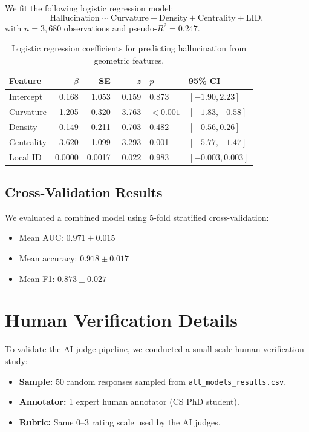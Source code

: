 \documentclass{article}
\begin{document}
We fit the following logistic regression model:
\begin{equation*}
    \text{Hallucination} \sim \text{Curvature} + \text{Density} + \text{Centrality} + \text{LID},
\end{equation*}
with $n = 3{,}680$ observations and pseudo-$R^{2} = 0.247$.

\begin{table}[h]
    \centering
    \caption{Logistic regression coefficients for predicting hallucination from geometric features.}
    \label{tab:logit-full}
    \begin{tabular}{l r r r l l}
        \toprule
        Feature      & $\beta$ & SE    & $z$      & $p$        & 95\% CI \\
        \midrule
        Intercept    &  0.168  & 1.053 &  0.159   & 0.873      & $[-1.90, 2.23]$ \\
        Curvature    & -1.205  & 0.320 & -3.763   & $<0.001$   & $[-1.83, -0.58]$ \\
        Density      & -0.149  & 0.211 & -0.703   & 0.482      & $[-0.56, 0.26]$ \\
        Centrality   & -3.620  & 1.099 & -3.293   & 0.001      & $[-5.77, -1.47]$ \\
        Local ID     &  0.0000 & 0.0017&  0.022   & 0.983      & $[-0.003, 0.003]$ \\
        \bottomrule
    \end{tabular}
\end{table}

\subsection{Cross-Validation Results}

We evaluated a combined model using 5-fold stratified cross-validation:
\begin{itemize}
    \item Mean AUC: $0.971 \pm 0.015$
    \item Mean accuracy: $0.918 \pm 0.017$
    \item Mean F1: $0.873 \pm 0.027$
\end{itemize}

\section{Human Verification Details}
\label{app:human-verification}

To validate the AI judge pipeline, we conducted a small-scale human verification study:
\begin{itemize}
    \item \textbf{Sample:} 50 random responses sampled from \texttt{all\_models\_results.csv}.
    \item \textbf{Annotator:} 1 expert human annotator (CS PhD student).
    \item \textbf{Rubric:} Same 0--3 rating scale used by the AI judges.
\end{itemize}
\end{document}
